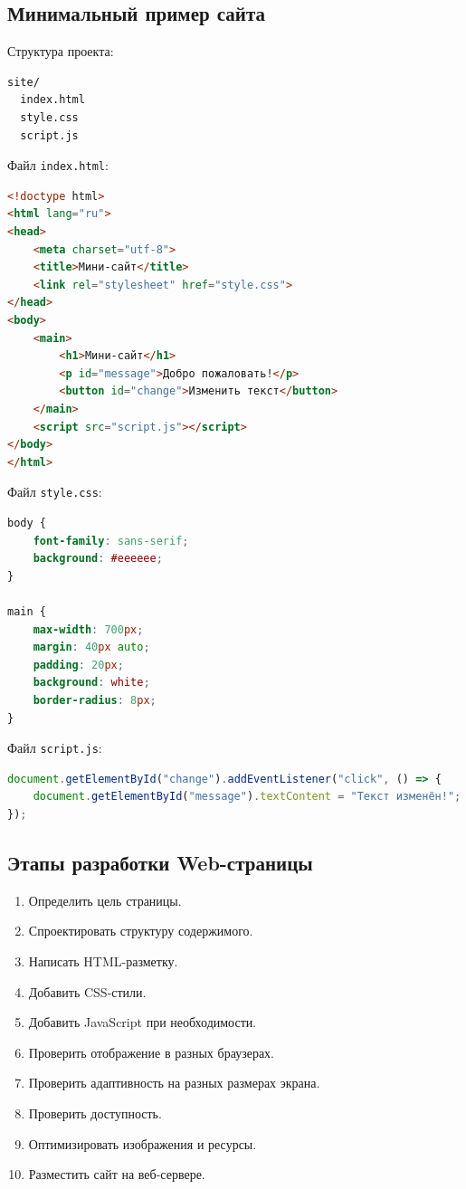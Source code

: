 \documentclass[12pt,a4paper]{article}
\begin{document}
\subsection{Минимальный пример сайта}

Структура проекта:
\begin{lstlisting}
site/
  index.html
  style.css
  script.js
\end{lstlisting}

Файл \texttt{index.html}:
\begin{lstlisting}[language=HTML]
<!doctype html>
<html lang="ru">
<head>
    <meta charset="utf-8">
    <title>Мини-сайт</title>
    <link rel="stylesheet" href="style.css">
</head>
<body>
    <main>
        <h1>Мини-сайт</h1>
        <p id="message">Добро пожаловать!</p>
        <button id="change">Изменить текст</button>
    </main>
    <script src="script.js"></script>
</body>
</html>
\end{lstlisting}

Файл \texttt{style.css}:
\begin{lstlisting}[language=CSS]
body {
    font-family: sans-serif;
    background: #eeeeee;
}

main {
    max-width: 700px;
    margin: 40px auto;
    padding: 20px;
    background: white;
    border-radius: 8px;
}
\end{lstlisting}

Файл \texttt{script.js}:
\begin{lstlisting}[language=JavaScript]
document.getElementById("change").addEventListener("click", () => {
    document.getElementById("message").textContent = "Текст изменён!";
});
\end{lstlisting}

\subsection{Этапы разработки Web-страницы}

\begin{enumerate}
    \item Определить цель страницы.
    \item Спроектировать структуру содержимого.
    \item Написать HTML-разметку.
    \item Добавить CSS-стили.
    \item Добавить JavaScript при необходимости.
    \item Проверить отображение в разных браузерах.
    \item Проверить адаптивность на разных размерах экрана.
    \item Проверить доступность.
    \item Оптимизировать изображения и ресурсы.
    \item Разместить сайт на веб-сервере.
\end{enumerate}
\end{document}
